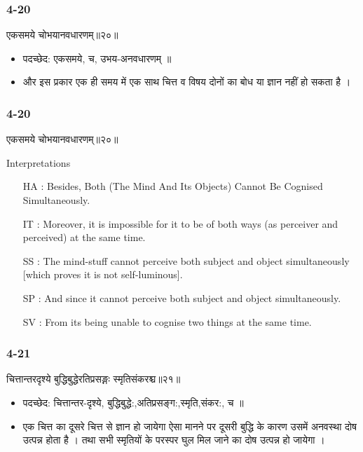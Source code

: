 \begin{frame}[fragile]\frametitle{4-20}
\begin{sanskrit}
एकसमये चोभयानवधारणम्॥२०॥
\end{sanskrit}

\begin{itemize}
\item पदच्छेद: एकसमये, च, उभय-अनवधारणम् ॥
\item और इस प्रकार एक ही समय में एक साथ चित्त व विषय दोनों का बोध या ज्ञान नहीं हो सकता है ।
\end{itemize}
\end{frame}

\begin{frame}[fragile]\frametitle{4-20}
\begin{sanskrit}
एकसमये चोभयानवधारणम्॥२०॥
\end{sanskrit}

Interpretations
\begin{itemize}	
\item [HA]: Besides, Both (The Mind And Its Objects) Cannot Be Cognised Simultaneously.
\item [IT]: Moreover, it is impossible for it to be of both ways (as perceiver and perceived) at the same time.
\item [SS]: The mind-stuff cannot perceive both subject and object simultaneously [which proves it is not self-luminous].
\item [SP]: And since it cannot perceive both subject and object simultaneously.
\item [SV]: From its being unable to cognise two things at the same time. 
\end{itemize}
\end{frame}

\begin{frame}[fragile]\frametitle{4-21}
\begin{sanskrit}
चित्तान्तरदृश्ये बुद्धिबुद्धेरतिप्रसङ्गः स्मृतिसंकरश्च॥२१॥
\end{sanskrit}

\begin{itemize}
\item पदच्छेद:  ‌चित्तान्तर-दृश्ये, बुद्धिबुद्धे:,अतिप्रसङ्ग:,स्मृति,संकर:, च ‌॥
\item एक चित्त का दूसरे चित्त से ज्ञान हो जायेगा ऐसा मानने पर दूसरी बुद्धि के कारण उसमें अनवस्था दोष उत्पन्न होता है । तथा सभी स्मृतियों के परस्पर घुल मिल जाने का दोष उत्पन्न हो जायेगा ।
\end{itemize}
\end{frame}


